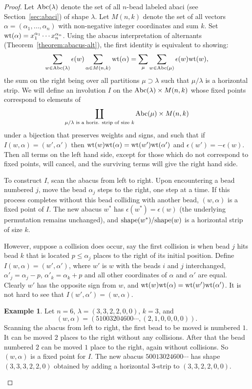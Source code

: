 \documentclass[11pt]{amsproc}
\theoremstyle{definition}
\theoremstyle{example}
\newtheorem{example}[theorem]{Example}
\newcommand{\wt}{\textup{wt}}
\newcommand{\shape}{\textup{shape}}
\newcommand{\abc}{\textup{Abc}}
\begin{document}
\begin{proof}
  Let $\abc(\lambda)$ denote the set of all $n$-bead labeled abaci (see Section~\ref{sec:abaci}) of shape $\lambda$.
  Let $M(n,k)$ denote the set of all vectors $\alpha=(\alpha_1,\dots,\alpha_n)$ with non-negative integer coordinates and sum $k$.
  Set $\wt(\alpha)=x_1^{\alpha_1}\dotsb x_n^{\alpha_n}$.
  Using the abacus interpretation of alternants (Theorem~\ref{theorem:abacus-alt}), the first identity is equivalent to showing:
  \begin{displaymath}
    \sum_{w\in \abc(\lambda)} \epsilon(w)\sum_{\alpha\in M(n,k)} \wt(\alpha) = \sum_\mu \sum_{w\in \abc(\mu)} \epsilon(w) \wt(w),
  \end{displaymath}
  the sum on the right being over all partitions $\mu\supset\lambda$ such that $\mu/\lambda$ is a horizontal strip.
  We will define an involution $I$ on the $\abc(\lambda)\times M(n,k)$ whose fixed points correspond to elements of
\begin{displaymath}
  \coprod_{\mu/\lambda \text{ is a horiz. strip of size $k$}}\abc(\mu)\times M(n,k)
\end{displaymath}
under a bijection that preserves weights and signs, and such that if $I(w, \alpha)=(w', \alpha')$ then $\wt(w)\wt(\alpha)=\wt(w')\wt(\alpha')$ and $\epsilon(w') = -\epsilon(w)$.
  Then all terms on the left hand side, except for those which do not correspond to fixed points, will cancel, and the surviving terms will give the right hand side.

  To construct $I$, scan the abacus from left to right.
  Upon encountering a bead numbered $j$, move the bead $\alpha_j$ steps to the right, one step at a time.
  If this process completes without this bead colliding with another bead, $(w,\alpha)$ is a fixed point of $I$.
  The new abacus $w^*$ has $\epsilon(w^*)=\epsilon(w)$ (the underlying permutation remains unchanged), and $\shape(w^*)/\shape(w)$ is a horizontal strip of size $k$.

  However, suppose a collision does occur, say the first collision is when bead $j$ hits bead $k$ that is located $p\leq \alpha_j$ places to the right of its initial position.
  Define $I(w,\alpha) = (w',\alpha')$, where $w'$ is $w$ with the beads $i$ and $j$ interchanged, $\alpha'_j=\alpha_j-p$, $\alpha'_k=\alpha_k+p$ and all other coordinates of $\alpha$ and $\alpha'$ are equal.
  Clearly $w'$ has the opposite sign from $w$, and $\wt(w)\wt(\alpha)=\wt(w')\wt(\alpha')$.
  It is not hard to see that $I(w',\alpha')=(w,\alpha)$.
  \begin{example}
    \label{example:bead-h}
    Let $n=6$, $\lambda=(3,3,2,2,0,0)$, $k=3$, and
    \begin{displaymath}
      (w, \alpha) = (51003204600\dotsb, (2, 1, 0, 0, 0, 0)). 
    \end{displaymath}
    Scanning the abacus from left to right, the first bead to be moved is numbered $1$.
    It can be moved $2$ places to the right without any collisions.
    After that the bead numbered $2$ can be moved $1$ place to the right, again without collisions.
    So $(w,\alpha)$ is a fixed point for $I$.
    The new abacus $50013024600\dotsb$ has shape $(3,3,3,2,2,0)$ obtained by adding a horizontal $3$-strip to $(3, 3, 2, 2, 0, 0)$.


\end{example}
\end{proof}
\end{document}
